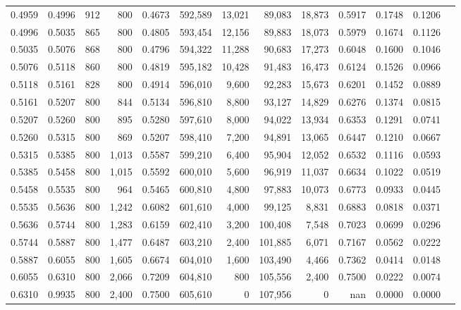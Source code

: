 \begin{tabular}{rrrrrrrrrrrrr}
0.4959 & 0.4996 &    912 &   800 &                                     0.4673 & 592,589 &  13,021 &  89,083 &  18,873 & 0.5917 & 0.1748 & 0.1206 \\
0.4996 & 0.5035 &    865 &   800 &                                     0.4805 & 593,454 &  12,156 &  89,883 &  18,073 & 0.5979 & 0.1674 & 0.1126 \\
0.5035 & 0.5076 &    868 &   800 &                                     0.4796 & 594,322 &  11,288 &  90,683 &  17,273 & 0.6048 & 0.1600 & 0.1046 \\
0.5076 & 0.5118 &    860 &   800 &                                     0.4819 & 595,182 &  10,428 &  91,483 &  16,473 & 0.6124 & 0.1526 & 0.0966 \\
0.5118 & 0.5161 &    828 &   800 &                                     0.4914 & 596,010 &   9,600 &  92,283 &  15,673 & 0.6201 & 0.1452 & 0.0889 \\
0.5161 & 0.5207 &    800 &   844 &                                     0.5134 & 596,810 &   8,800 &  93,127 &  14,829 & 0.6276 & 0.1374 & 0.0815 \\
0.5207 & 0.5260 &    800 &   895 &                                     0.5280 & 597,610 &   8,000 &  94,022 &  13,934 & 0.6353 & 0.1291 & 0.0741 \\
0.5260 & 0.5315 &    800 &   869 &                                     0.5207 & 598,410 &   7,200 &  94,891 &  13,065 & 0.6447 & 0.1210 & 0.0667 \\
0.5315 & 0.5385 &    800 & 1,013 &                                     0.5587 & 599,210 &   6,400 &  95,904 &  12,052 & 0.6532 & 0.1116 & 0.0593 \\
0.5385 & 0.5458 &    800 & 1,015 &                                     0.5592 & 600,010 &   5,600 &  96,919 &  11,037 & 0.6634 & 0.1022 & 0.0519 \\
0.5458 & 0.5535 &    800 &   964 &                                     0.5465 & 600,810 &   4,800 &  97,883 &  10,073 & 0.6773 & 0.0933 & 0.0445 \\
0.5535 & 0.5636 &    800 & 1,242 &                                     0.6082 & 601,610 &   4,000 &  99,125 &   8,831 & 0.6883 & 0.0818 & 0.0371 \\
0.5636 & 0.5744 &    800 & 1,283 &                                     0.6159 & 602,410 &   3,200 & 100,408 &   7,548 & 0.7023 & 0.0699 & 0.0296 \\
0.5744 & 0.5887 &    800 & 1,477 &                                     0.6487 & 603,210 &   2,400 & 101,885 &   6,071 & 0.7167 & 0.0562 & 0.0222 \\
0.5887 & 0.6055 &    800 & 1,605 &                                     0.6674 & 604,010 &   1,600 & 103,490 &   4,466 & 0.7362 & 0.0414 & 0.0148 \\
0.6055 & 0.6310 &    800 & 2,066 &                                     0.7209 & 604,810 &     800 & 105,556 &   2,400 & 0.7500 & 0.0222 & 0.0074 \\
0.6310 & 0.9935 &    800 & 2,400 &                                     0.7500 & 605,610 &       0 & 107,956 &       0 &    nan & 0.0000 & 0.0000 \\
\bottomrule
\end{tabular}
